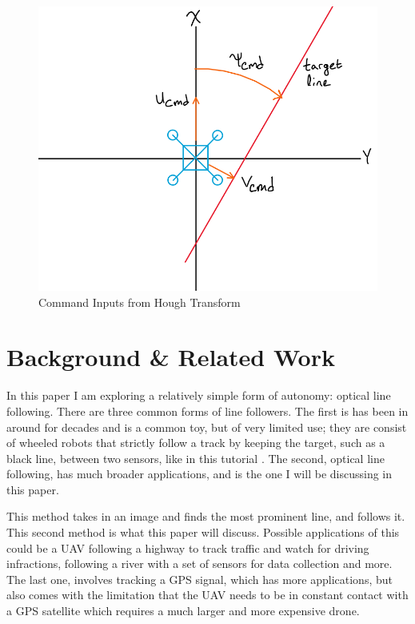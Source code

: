 \documentclass[10pt,twocolumn,letterpaper]{article}
\begin{document}
		\begin{figure}[!t] %
		\begin{center}
			\includegraphics[width=\linewidth]{matlab/controller_model}
		\end{center}
		\caption{Command Inputs from Hough Transform}
		\label{fig:line_cmd}
	\end{figure}
	
	\section{Background \& Related Work}
		In this paper I am exploring a relatively simple form of autonomy: optical line following. There are three common forms of line followers. The first is has been in around for decades and is a common toy, but of very limited use; they are consist of wheeled robots that strictly follow a track by keeping the target, such as a black line, between two sensors, like in this tutorial \cite{arduino}. The second, optical line following, has much broader applications, and is the one I will be discussing in this paper. 
		
		This method takes in an image and finds the most prominent line, and follows it. This second method is what this paper will discuss. Possible applications of this could be a UAV following a highway to track traffic and watch for driving infractions, following a river with a set of sensors for data collection and more. The last one, involves tracking a GPS signal, which has more applications, but also comes with the limitation that the UAV needs to be in constant contact with a GPS satellite which requires a much larger and more expensive drone. 
	
\end{document}
